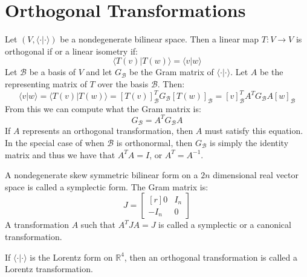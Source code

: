 \documentclass{article}                                                        %
\begin{document}
    \section{Orthogonal Transformations}
        Let $(V,\langle\cdot|\cdot\rangle)$ be a nondegenerate bilinear space.
        Then a linear map $T:V\rightarrow{V}$ is orthogonal if or a linear
        isometry if:
        \begin{equation}
            \langle{T}(v)|T(w)\rangle=\langle{v}|w\rangle
        \end{equation}
        Let $\mathscr{B}$ be a basis of $V$ and let $G_{\mathscr{B}}$ be the
        Gram matrix of $\langle\cdot|\cdot\rangle$. Let $A$ be the representing
        matrix of $T$ over the basis $\mathscr{B}$. Then:
        \begin{equation}
            \langle{v}|w\rangle
            =\langle{T}(v)|T(w)\rangle
            =[T(v)]_{\mathscr{B}}^{T}G_{\mathscr{B}}[T(w)]_{\mathscr{B}}
            =[v]_{\mathscr{B}}^{T}A^{T}G_{\mathscr{B}}A[w]_{\mathscr{B}}
        \end{equation}
        From this we can compute what the Gram matrix is:
        \begin{equation}
            G_{\mathscr{B}}=A^{T}G_{\mathscr{B}}A
        \end{equation}
        If $A$ represents an orthogonal transformation, then $A$ must satisfy
        this equation. In the special case of when $\mathscr{B}$ is orthonormal,
        then $G_{\mathscr{B}}$ is simply the identity matrix and thus we have
        that $A^{T}A=I$, or $A^{T}=A^{\minus{1}}$.
        \par\hfill\par
        A nondegenerate skew symmetric bilinear form on a $2n$ dimensional real
        vector space is called a symplectic form. The Gram matrix is:
        \begin{equation}
            J=
            \begin{bmatrix*}[r]
                0&I_{n}\\
                \minus{I}_{n}&0
            \end{bmatrix*}
        \end{equation}
        A transformation $A$ such that $A^{T}JA=J$ is called a symplectic or
        a canonical transformation.
        \par\hfill\par
        If $\langle\cdot|\cdot\rangle$ is the Lorentz form on $\mathbb{R}^{4}$,
        then an orthogonal transformation is called a Lorentz transformation.
\end{document}
